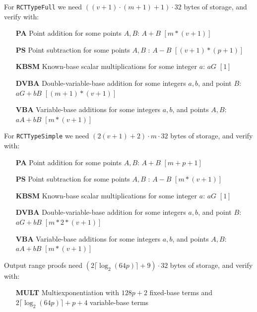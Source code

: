 For {\tt RCTTypeFull} we need $((v + 1) \cdot (m + 1) + 1) \cdot 32$ bytes of storage, and verify with:
\begin{itemize}
    \setlength\itemsep{\listspace}
    \item [\textbf{PA}] Point addition for some points $A, B$: $A + B$ \quad \([m*(v+1)]\)%
    \item [\textbf{PS}] Point subtraction for some points $A, B$ : $A - B$ \quad \([(v+1)*(p+1)]\)%
    \item [\textbf{KBSM}] Known-base scalar multiplications for some integer $a$: $a G$ \quad \([1]\)%
    \item [\textbf{DVBA}] Double-variable-base addition for some integers $a, b$, and point $B$: $a G + b B$ \quad \([(m+1)*(v+1)]\)%
    \item [\textbf{VBA}] Variable-base additions for some integers $a, b$, and points $A, B$: $a A + b B$ \quad \([m*(v+1)]\)%
\end{itemize}

For {\tt RCTTypeSimple} we need $(2(v+1)+2) \cdot m \cdot 32$ bytes of storage, and verify with:
\begin{itemize}
    \setlength\itemsep{\listspace}
    \item [\textbf{PA}] Point addition for some points $A, B$: $A + B$ \quad \([m + p + 1]\)%
    \item [\textbf{PS}] Point subtraction for some points $A, B$ : $A - B$ \quad \([m*(v+1)]\)
    \item [\textbf{KBSM}] Known-base scalar multiplications for some integer $a$: $a G$ \quad \([1]\)%
    \item [\textbf{DVBA}] Double-variable-base addition for some integers $a, b$, and point $B$: $a G + b B$ \quad \([m*2*(v+1)]\)
    \item [\textbf{VBA}] Variable-base additions for some integers $a, b$, and points $A, B$: $a A + b B$ \quad \([m*(v+1)]\)
\end{itemize}

Output range proofs need $( 2 \lceil \log_2(64p) \rceil + 9 ) \cdot 32$ bytes of storage, and verify with:
\begin{itemize}
    \setlength\itemsep{\listspace}
    \item [\textbf{MULT}] Multiexponentiation with $128p + 2$ fixed-base terms and $2 \lceil \log_2(64p) \rceil + p + 4$ variable-base terms
\end{itemize}


